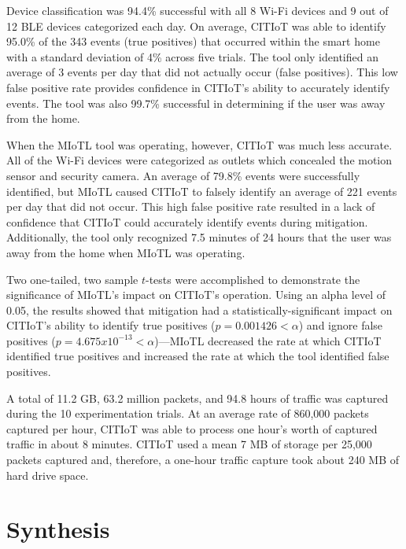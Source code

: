 \documentclass[journal]{./IEEEtran/IEEEtran}
\begin{document}
\tableTotalResultsIEEE

Device classification was 94.4\% successful with all 8 Wi-Fi devices and 9 out of 12 \ac{BLE} devices categorized each day. On average, \ac{CITIoT} was able to identify 95.0\% of the 343 events (true positives) that occurred within the smart home with a standard deviation of 4\% across five trials. The tool only identified an average of 3 events per day that did not actually occur (false positives). This low false positive rate provides confidence in \ac{CITIoT}'s ability to accurately identify events. The tool was also 99.7\% successful in determining if the user was away from the home. 

When the \ac{MIoTL} tool was operating, however, \ac{CITIoT} was much less accurate. All of the Wi-Fi devices were categorized as outlets which concealed the motion sensor and security camera. An average of 79.8\% events were successfully identified, but \ac{MIoTL} caused \ac{CITIoT} to falsely identify an average of 221 events per day that did not occur. This high false positive rate resulted in a lack of confidence that \ac{CITIoT} could accurately identify events during mitigation. Additionally, the tool only recognized 7.5 minutes of 24 hours that the user was away from the home when \ac{MIoTL} was operating. 

Two one-tailed, two sample $t$-tests were accomplished to demonstrate the significance of \ac{MIoTL}'s impact on \ac{CITIoT}'s operation. Using an alpha level of 0.05, the results showed that mitigation had a statistically-significant impact on \ac{CITIoT}'s ability to identify true positives ($p = 0.001426 < \alpha$) and ignore false positives  ($p = 4.675 x 10^{-13} < \alpha$)---\ac{MIoTL} decreased the rate at which \ac{CITIoT} identified true positives and increased the rate at which the tool identified false positives.

A total of 11.2 GB, 63.2 million packets, and 94.8 hours of traffic was captured during the 10 experimentation trials. At an average rate of 860,000 packets captured per hour, \ac{CITIoT} was able to process one hour's worth of captured traffic in about 8 minutes. \ac{CITIoT} used a mean 7 MB of storage per 25,000 packets captured and, therefore, a one-hour traffic capture took about 240 MB of hard drive space.

\section{Synthesis}\label{synthesis}
\end{document}
